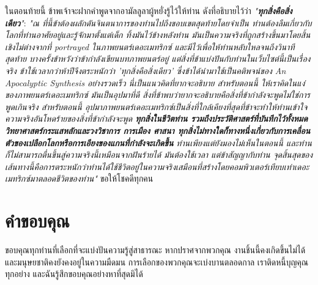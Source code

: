 \documentclass[10pt,twocolumn,letterpaper]{article}
\begin{document}
ในตอนท้ายนี้ ข้าพเจ้าจะฝากคำพูดจากอามัลลูลาผู้หยั่งรู้ไว้ให้ท่าน ดังที่อธิบายไว้ว่า \textit{"\textbf{ทุกสิ่งคือสิ่งเดียว}"}: \textit{"ณ ที่นี้ข้าต้องผลักดันจินตนาการของท่านไปถึงขอบเขตสุดท้ายโดยจำเป็น ท่านต้องลืมเกี่ยวกับโลกที่ท่านอาศัยอยู่และรู้จักมาตั้งแต่เด็ก ทิ้งมันไว้ข้างหลังท่าน มันเป็นความจริงที่ถูกสร้างขึ้นมาโดยสิ้นเชิงไม่ต่างจากที่ portrayed ในภาพยนตร์เดอะเมทริกซ์ และมีไว้เพื่อให้ท่านหลับใหลจนถึงวินาทีสุดท้าย บางครั้งข้าหวังว่าข้ากำลังเขียนบทภาพยนตร์อยู่ แต่สิ่งที่ข้าแบ่งปันกับท่านในเว็บไซต์นี้เป็นเรื่องจริง ข้าใช้เวลากว่าห้าปีจึงตระหนักว่า 'ทุกสิ่งคือสิ่งเดียว' ซึ่งข้าได้นำมาใช้เป็นคติพจน์ของ An Apocalyptic Synthesis อย่างรวดเร็ว นี่เป็นแนวคิดที่ยากจะอธิบาย สำหรับตอนนี้ ให้เราคิดในแง่ของภาพยนตร์เดอะเมทริกซ์ มันเป็นอุปมาที่ดี สิ่งที่ข้าพบว่ายากจะอธิบายคือสิ่งที่ข้ากำลังจะพูดไม่ใช่การพูดเกินจริง สำหรับตอนนี้ อุปมาภาพยนตร์เดอะเมทริกซ์เป็นสิ่งที่ใกล้เคียงที่สุดที่ข้าจะทำให้ท่านเข้าใจความจริงอันโหดร้ายของสิ่งที่ข้ากำลังจะพูด \textbf{ทุกสิ่งในชีวิตท่าน รวมถึงประวัติศาสตร์ที่บันทึกไว้ทั้งหมด วิทยาศาสตร์กระแสหลักและวงวิชาการ การเมือง ศาสนา ทุกสิ่งไม่ทางใดก็ทางหนึ่งเกี่ยวกับการเคลื่อนตัวของเปลือกโลกหรือการเอียงของแกนที่กำลังจะเกิดขึ้น} ท่านเพียงแต่ยังมองไม่เห็นในตอนนี้ และท่านก็ไม่สามารถตื่นขึ้นสู่ความจริงนี้เหมือนจากฝันร้ายได้ มันต้องใช้เวลา แต่ข้าสัญญากับท่าน จุดสิ้นสุดของเส้นทางนี้คือการตระหนักว่าท่านได้ใช้ชีวิตอยู่ในความจริงเสมือนที่สร้างโดยคอมพิวเตอร์เทียบเท่าเดอะเมทริกซ์มาตลอดชีวิตของท่าน"} \cite{33,34}
ขอให้โชคดีทุกคน

\section{คำขอบคุณ}

ขอบคุณทุกท่านที่เลือกที่จะแบ่งปันความรู้สู่สาธารณะ หากปราศจากพวกคุณ งานชิ้นนี้คงเกิดขึ้นไม่ได้ และมนุษยชาติคงยังคงอยู่ในความมืดมน การเลือกของพวกคุณจะเบ่งบานตลอดกาล เราติดหนี้บุญคุณทุกอย่าง และฉันรู้สึกขอบคุณอย่างหาที่สุดมิได้
\clearpage
\twocolumn

{\small
\renewcommand{\refname}{เอกสารอ้างอิง}


}
\end{document}
